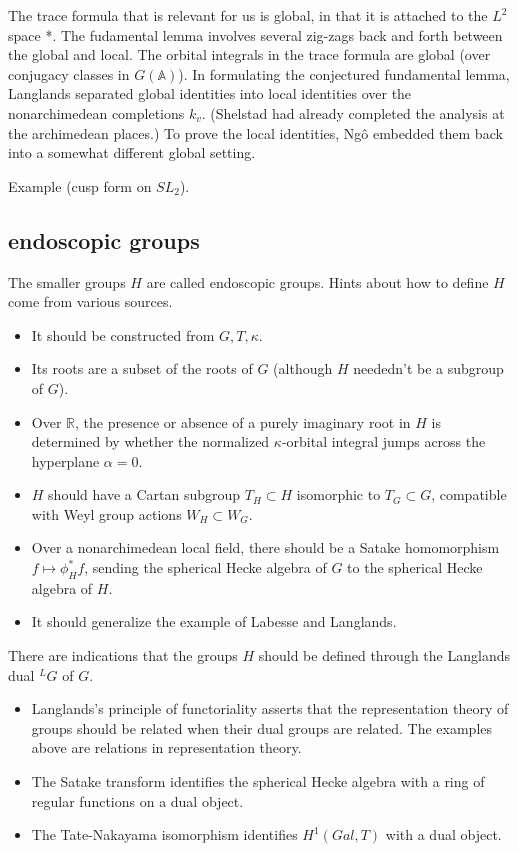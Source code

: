 \documentclass[brochure,english,12pt]{bourbaki}
\newcommand{\ring}[1]{\mathbb{#1}}
\def\AD{\ring{A}}
\begin{document}
The trace formula that is relevant for us is global, in that it is
attached to the $L^2$ space *.  The fudamental lemma involves several
zig-zags back and forth between the global and local.  The orbital
integrals in the trace formula are global (over conjugacy classes in
$G(\AD)$).  In formulating the conjectured fundamental lemma, Langlands
separated global identities into local identities over the
nonarchimedean completions $k_v$.  (Shelstad had already completed the
analysis at the archimedean places.)  To prove the local identities,
Ng\^o embedded them back into a somewhat different global setting.

Example (cusp form on $SL_2$).


\subsection{endoscopic groups}

The
smaller groups $H$ are called endoscopic groups.
Hints about how to define $H$ come from various sources.
\begin{itemize}
\item It should be constructed from $G,T,\kappa$.
\item Its roots are a subset of the roots of $G$ (although $H$ neededn't
be a subgroup of $G$).
\item Over $\ring{R}$, the presence or absence of a purely imaginary
root in $H$ is determined by whether the normalized $\kappa$-orbital
integral jumps across the hyperplane $\alpha=0$.
\item $H$ should have a Cartan subgroup $T_H\subset H$ isomorphic to
$T_G\subset G$, compatible with Weyl group actions $W_H\subset W_G$.
\item Over a nonarchimedean local field, there should be a Satake
homomorphism $f \mapsto \phi^*_Hf$, sending the spherical Hecke algebra
of $G$ to the spherical Hecke algebra of $H$.
\item It should generalize the example of Labesse and Langlands.
\end{itemize}

There are indications that the groups $H$ should be defined through  
the Langlands dual ${}^LG$ of $G$.
\begin{itemize}
\item Langlands's principle of functoriality asserts that the
  representation theory of groups should be related when their dual
  groups are related.  The examples above are relations in
  representation theory.
\item The Satake transform identifies the spherical Hecke algebra with
  a ring of regular functions on a dual object.
\item The Tate-Nakayama isomorphism identifies $H^1(Gal,T)$
with a dual object.
\end{itemize}
\end{document}
